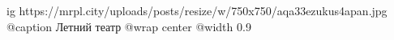  
 
 
 
 

\ifcmt
  ig https://mrpl.city/uploads/posts/resize/w/750x750/aqa33ezukus4apan.jpg
	@caption Летний театр
  @wrap center
  @width 0.9
\fi
